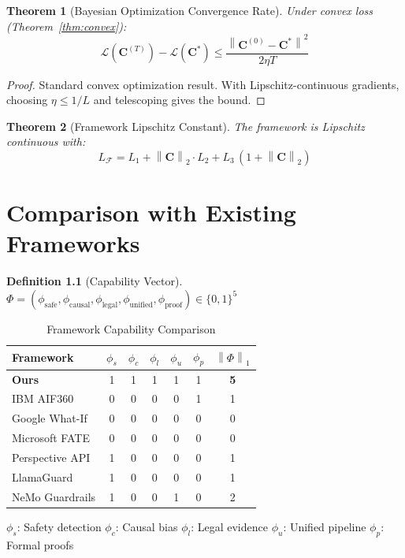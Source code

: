 \documentclass[12pt,a4paper]{report}
\theoremstyle{plain}
\newtheorem{theorem}{Theorem}[chapter]
\theoremstyle{definition}
\newtheorem{definition}[theorem]{Definition}
\theoremstyle{remark}
\newcommand{\framework}{\mathcal{F}}
\newcommand{\scam}{\mathbf{C}}
\newcommand{\norm}[1]{\left\|#1\right\|}
\begin{document}
\begin{theorem}[Bayesian Optimization Convergence Rate]
Under convex loss (Theorem~\ref{thm:convex}):
\begin{equation}
    \mathcal{L}(\scam^{(T)}) - \mathcal{L}(\scam^*)
    \leq \frac{\norm{\scam^{(0)} - \scam^*}^2}{2\eta T}
\end{equation}
\end{theorem}
\begin{proof}
Standard convex optimization result. With
Lipschitz-continuous gradients, choosing $\eta \leq 1/L$
and telescoping gives the bound.
\end{proof}

\begin{theorem}[Framework Lipschitz Constant]
The framework is Lipschitz continuous with:
\begin{equation}
    L_{\framework}
    = L_1 + \norm{\scam}_2 \cdot L_2
    + L_3\,(1 + \norm{\scam}_2)
\end{equation}
\end{theorem}

\chapter{Comparison with Existing Frameworks}
\label{ch:compare}

\begin{definition}[Capability Vector]
$\Phi = (\phi_{\text{safe}}, \phi_{\text{causal}},
\phi_{\text{legal}}, \phi_{\text{unified}},
\phi_{\text{proof}}) \in \{0,1\}^5$
\end{definition}

\begin{table}[htbp]
\centering
\caption{Framework Capability Comparison}
\begin{tabular}{lcccccc}
\toprule
\textbf{Framework}
& $\phi_s$ & $\phi_c$ & $\phi_l$
& $\phi_u$ & $\phi_p$
& $\norm{\Phi}_1$ \\
\midrule
\textbf{Ours}
& \cellcolor{green!25}1
& \cellcolor{green!25}1
& \cellcolor{green!25}1
& \cellcolor{green!25}1
& \cellcolor{green!25}1
& \cellcolor{green!25}\textbf{5} \\
IBM AIF360      & 0 & 0 & 0 & 0 & 1 & 1 \\
Google What-If  & 0 & 0 & 0 & 0 & 0 & 0 \\
Microsoft FATE  & 0 & 0 & 0 & 0 & 0 & 0 \\
Perspective API & 1 & 0 & 0 & 0 & 0 & 1 \\
LlamaGuard      & 1 & 0 & 0 & 0 & 0 & 1 \\
NeMo Guardrails & 1 & 0 & 0 & 1 & 0 & 2 \\
\bottomrule
\end{tabular}

\vspace{4pt}
\footnotesize
$\phi_s$: Safety detection\quad
$\phi_c$: Causal bias\quad
$\phi_l$: Legal evidence\quad
$\phi_u$: Unified pipeline\quad
$\phi_p$: Formal proofs
\end{table}
\end{document}

